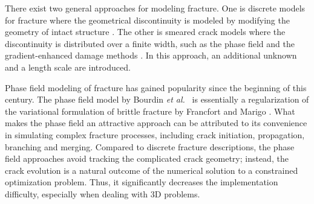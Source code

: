 There exist two general approaches for modeling fracture. One is discrete models for fracture where the geometrical discontinuity is modeled by modifying the geometry of intact structure \cite{ngo1967finite,moes1999finite,RaChHuShLe14,verhoosel2011isogeometric}. %
The other is smeared crack models where the discontinuity is distributed over a finite width, such as the phase field \cite{Bourdin2000797} and the gradient-enhanced damage methods \cite{Peerlings19963391}.
In this approach, an additional unknown and a length scale are introduced. %

Phase field modeling of fracture has gained popularity since the beginning of this century. The phase field model by Bourdin  \emph{et al.}~\cite{Bourdin2000797} is essentially a regularization of the variational formulation of brittle fracture by Francfort and Marigo \cite{Francfort19981319}. What makes the phase field an attractive approach can be attributed to its convenience in simulating complex fracture processes, including crack initiation, propagation, branching and merging. Compared to discrete fracture descriptions, the phase field approaches avoid tracking the complicated crack geometry; instead, the crack evolution is a natural outcome of the numerical solution to a {constrained optimization problem}. Thus, it significantly decreases the implementation difficulty, especially when dealing with 3D problems. 

